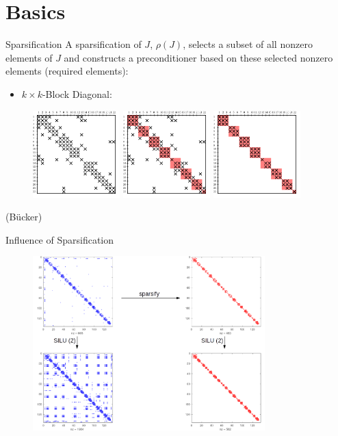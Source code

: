 \documentclass{beamer}
\newcommand{\sparsifysymbol}{\ensuremath{\rho}}
\newcommand{\sparsify}[1]{\ensuremath{\sparsifysymbol(#1)}}
\begin{document}
\section{Basics}
\begin{frame}{Sparsification}
A sparsification of $J$, \sparsify{J}, selects a 
subset of all nonzero elements of $J$ and constructs a
preconditioner based on these selected nonzero elements (required elements):
\begin{itemize}
\item $k\times k$-Block Diagonal:
\end{itemize}
\begin{figure}
\centering
\includegraphics[width=0.3\textwidth]{mat}
\includegraphics[width=0.3\textwidth]{mat_sparsify}
\includegraphics[width=0.3\textwidth]{mat_sparsify_removed}
\end{figure}
(B{\"u}cker)
\end{frame}

\begin{frame}{Influence of Sparsification}
\begin{figure}
\centering
\includegraphics[width=0.8\textwidth]{sparsify}
\end{figure}
\end{frame}
\end{document}
